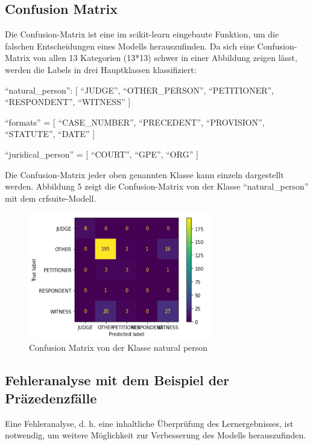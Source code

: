 \documentclass[paper=A4, ngerman, fontsize=12pt]{article}
\begin{document}
	\subsection{Confusion Matrix}
	\noindent
	Die Confusion-Matrix ist eine im scikit-learn eingebaute Funktion, um die falschen Entscheidungen eines Modells herauszufinden. Da sich eine Confusion-Matrix von allen 13 Kategorien (13*13) schwer in einer Abbildung zeigen lässt,  werden die Labels in drei Hauptklassen klassifiziert:
	
	\clearpage
	\indent
	\enquote{natural\_person}: [ \enquote{JUDGE}, \enquote{OTHER\_PERSON}, \enquote{PETITIONER}, \enquote{RESPONDENT}, \enquote{WITNESS} ]
	
	\indent
	\enquote{formats} = [ \enquote{CASE\_NUMBER}, \enquote{PRECEDENT}, \enquote{PROVISION}, \enquote{STATUTE}, \enquote{DATE} ]
	
	\indent
	\enquote{juridical\_person} = [ \enquote{COURT}, \enquote{GPE}, \enquote{ORG} ]
	
	\indent
	Die Confusion-Matrix jeder oben genannten Klasse kann einzeln dargestellt werden. Abbildung 5 zeigt die Confusion-Matrix von der Klasse \enquote{natural\_person} mit dem crfsuite-Modell. 
	
	\begin{figure}
		\begin{center}
			\includegraphics[width=8cm]{Illustrations/confusion_matrix.png}
			\caption{Confusion Matrix von der Klasse natural person}
			\label{Confusion Matrix von der Klasse natural person}
		\end{center}
	\end{figure}

	\subsection{Fehleranalyse mit dem Beispiel der Präzedenzfälle}
	\noindent
	Eine Fehleranalyse, d. h. eine inhaltliche Überprüfung des Lernergebnisses, ist notwendig, um weitere Möglichkeit zur Verbesserung des Modells herauszufinden.  
	
\end{document}
